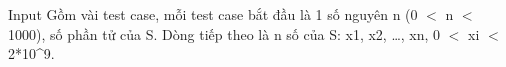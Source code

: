 Input
Gồm vài test case, mỗi test case bắt đầu là 1 số nguyên n (0 $<$  n $<$ 1000),  số phần tử của S. Dòng tiếp theo là n số của S: x1, x2, …, xn,  0 $<$ xi $<$ 2*10^9.